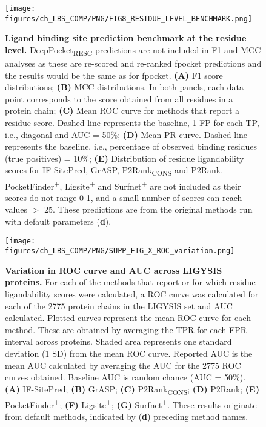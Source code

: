 \begin{figure}[htb!]
    \centering
    \texttt{[image: figures/ch\_LBS\_COMP/PNG/FIG8\_RESIDUE\_LEVEL\_BENCHMARK.png]}
    \caption[Ligand binding site prediction benchmark at the residue level]{\textbf{Ligand binding site prediction benchmark at the residue level.} DeepPocket\textsubscript{RESC} predictions are not included in F1 and MCC analyses as these are re-scored and re-ranked fpocket predictions and the results would be the same as for fpocket. \textbf{(A)} F1 score distributions; \textbf{(B)} MCC distributions. In both panels, each data point corresponds to the score obtained from all residues in a protein chain; \textbf{(C)} Mean ROC curve for methods that report a residue score. Dashed line represents the baseline, 1 FP for each TP, i.e., diagonal and AUC = 50\%; \textbf{(D)} Mean PR curve. Dashed line represents the baseline, i.e., percentage of observed binding residues (true positives) = 10\%; \textbf{(E)} Distribution of residue ligandability scores for IF-SitePred, GrASP, P2Rank\textsubscript{CONS} and P2Rank. PocketFinder\textsuperscript{+}, Ligsite\textsuperscript{+} and Surfnet\textsuperscript{+} are not included as their scores do not range 0-1, and a small number of scores can reach values $>$ 25. These predictions are from the original methods run with default parameters (\textbf{d}).} 
    \label{fig:residue_level_benchmark}
\end{figure}

\begin{figure}[htb!]
    \centering
    \texttt{[image: figures/ch\_LBS\_COMP/PNG/SUPP\_FIG\_X\_ROC\_variation.png]}
    \caption[Variation in ROC curve and AUC across LIGYSIS proteins]{\textbf{Variation in ROC curve and AUC across LIGYSIS proteins.} For each of the methods that report or for which residue ligandability scores were calculated, a ROC curve was calculated for each of the 2775 protein chains in the LIGYSIS set and AUC calculated. Plotted curves represent the mean ROC curve for each method. These are obtained by averaging the TPR for each FPR interval across proteins. Shaded area represents one standard deviation (1 SD) from the mean ROC curve. Reported AUC is the mean AUC calculated by averaging the AUC for the 2775 ROC curves obtained. Baseline AUC is random chance (AUC = 50\%). \textbf{(A)} IF-SitePred; \textbf{(B)} GrASP; \textbf{(C)} P2Rank\textsubscript{CONS}; \textbf{(D)} P2Rank; \textbf{(E)} PocketFinder\textsuperscript{+}; \textbf{(F)} Ligsite\textsuperscript{+}; \textbf{(G)} Surfnet\textsuperscript{+}. These results originate from default methods, indicated by (\textbf{d}) preceding method names.}
    \label{fig:ROC_variation}
\end{figure}

